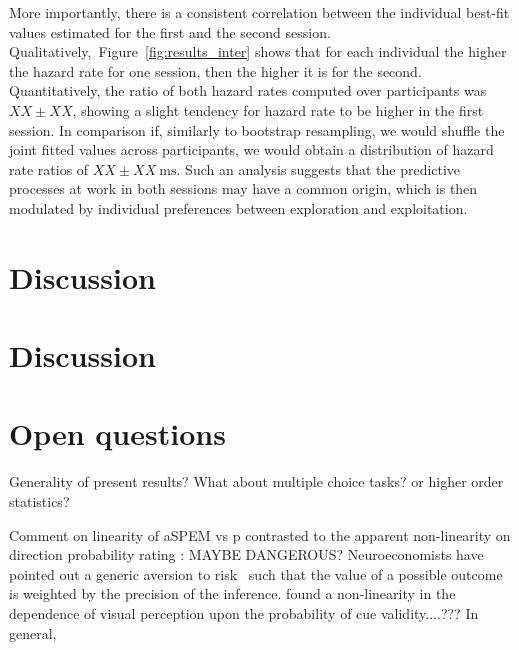 \documentclass[12pt,english]{article}%
\newcommand{\ms}{\si{\milli\second}}%
\newcommand{\citep}[1]{\parencite{#1}}
\newcommand{\citet}[1]{\textcite{#1}}
\newcommand{\seeFig}[1]{Figure~\ref{fig:#1}}
\begin{document}
More importantly, there is a  consistent
correlation between the individual best-fit values estimated for the first and the second session.
Qualitatively,~\seeFig{results_inter} shows that for each individual the higher the hazard rate for one session, then the higher it is for the second.
Quantitatively, the ratio of both hazard rates computed over participants was $XX \pm XX$,
showing a slight tendency for hazard rate to be higher in the first session.
In comparison if, similarly to bootstrap resampling,
we would shuffle the joint fitted values across participants,
we would obtain a distribution of hazard rate ratios of $XX \pm XX~\ms$.
Such an analysis suggests that the predictive processes
at work in both sessions may have a common origin,
which is then modulated by individual preferences
between exploration and exploitation.
\section{Discussion}
\label{sec:outro}

\section{Discussion}
\label{sec:outro}




\section{Open questions}
Generality of present results? What about multiple choice tasks? or higher order statistics?

Comment on linearity of aSPEM vs p contrasted to the apparent non-linearity on direction probability rating : MAYBE DANGEROUS?
Neuroeconomists have pointed out a generic aversion to risk~\citep{Kahneman13}
such that the value of a possible outcome
is weighted by the precision of the inference.
\citet{SantosKowler2017} found a non-linearity in the dependence of visual perception upon the probability of cue validity....???
In general,
\end{document}
